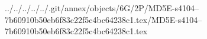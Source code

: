 ../../../../../.git/annex/objects/6G/2P/MD5E-s4104--7b60910b50eb6f83c22f5c4bc64238c1.tex/MD5E-s4104--7b60910b50eb6f83c22f5c4bc64238c1.tex